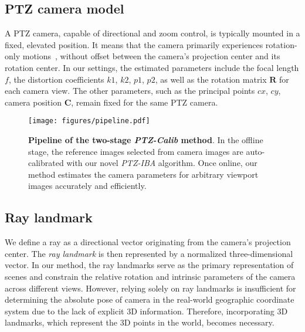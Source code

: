 \subsection{PTZ camera model}

A PTZ camera, capable of directional and zoom control, is typically mounted in a fixed, elevated position. It means that the camera primarily experiences rotation-only motions~\cite{hayman2003effects}, without offset between the camera's projection center and its rotation center. In our settings, the estimated parameters include the focal length $f$, the distortion coefficients $k1$, $k2$, $p1$, $p2$, as well as the rotation matrix $\mathbf{R}$ for each camera view. The other parameters, such as the principal points $cx$, $cy$, camera position $\mathbf{C}$, remain fixed for the same PTZ camera.

\begin{figure*}[!t]
    \centering
    \texttt{[image: figures/pipeline.pdf]}
    \caption{\textbf{Pipeline of the two-stage \emph{PTZ-Calib} method}. In the offline stage, the reference images selected from camera images are auto-calibrated with our novel \emph{PTZ-IBA} algorithm. Once online, our method estimates the camera parameters for arbitrary viewport images accurately and efficiently.}
    \label{fig:overview}
\end{figure*}


\subsection{Ray landmark} 

We define a ray as a directional vector originating from the camera's projection center. The \textit{ray landmark} is then represented by a normalized three-dimensional vector. In our method, the ray landmarks serve as the primary representation of scenes and constrain the relative rotation and intrinsic parameters of the camera across different views. However, relying solely on ray landmarks is insufficient for determining the absolute pose of camera in the real-world geographic coordinate system due to the lack of explicit 3D information. Therefore, incorporating 3D landmarks, which represent the 3D points in the world, becomes necessary.
